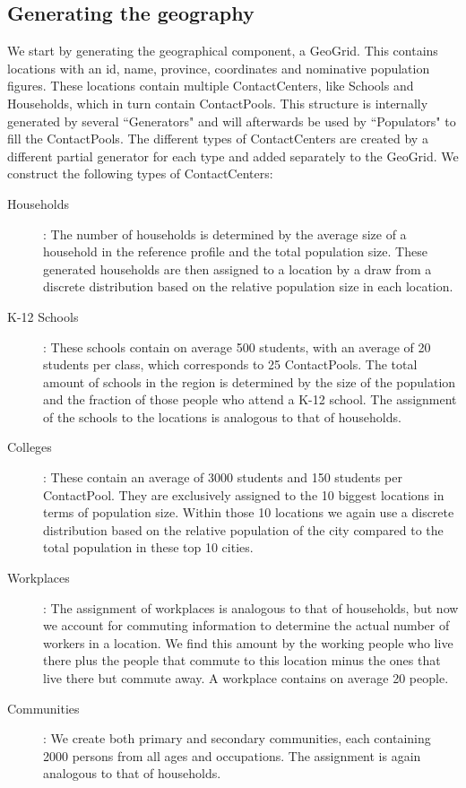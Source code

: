 \subsection{Generating the geography}
\label{subsection:gengeo}
We start by generating the geographical component, a GeoGrid.
This contains locations with an id, name, province, coordinates and nominative population figures.
These locations contain multiple ContactCenters, like Schools and Households, which in turn contain ContactPools.
This structure is internally generated by several ``Generators" and will afterwards be used by ``Populators" to fill the ContactPools.
The different types of ContactCenters are created by a different partial generator for each type and added separately to the GeoGrid.
We construct the following types of ContactCenters:

\begin{description}
    \item[Households]:
        The number of households is determined by the average size of a household in the reference profile and the total population size.
        These generated households are then assigned to a location by a draw from a discrete distribution based on the relative population size in each location.
    \item[K-12 Schools]:
        These schools contain on average 500 students, with an average of 20 students per class, which corresponds to 25 ContactPools.
        The total amount of schools in the region is determined by the size of the population and the fraction of those people who attend a K-12 school.
        The assignment of the schools to the locations is analogous to that of households.
    \item[Colleges]:
        These contain an average of 3000 students and 150 students per ContactPool.
        They are exclusively assigned to the 10 biggest locations in terms of population size.
        Within those 10 locations we again use a discrete distribution based on the relative population of the city compared to the total population in these top 10 cities.
    \item[Workplaces]:
        The assignment of workplaces is analogous to that of households, but now we account for commuting information to determine the actual number of workers in a location.
        We find this amount by the working people who live there plus the people that commute to this location minus the ones that live there but commute away.
        A workplace contains on average 20 people.
    \item[Communities]:
        We create both primary and secondary communities, each containing 2000 persons from all ages and occupations.
        The assignment is again analogous to that of households.
\end{description}

